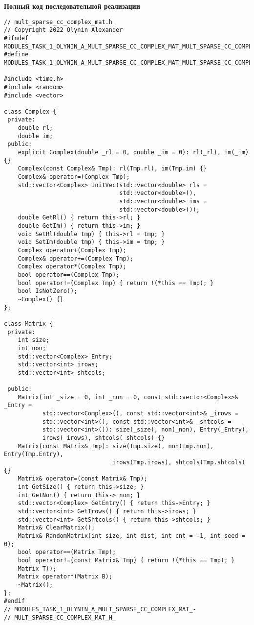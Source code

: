 \documentclass{report}
\begin{document}
\textbf{Полный код последовательной реализации}
\begin{lstlisting}
// mult_sparse_cc_complex_mat.h
// Copyright 2022 Olynin Alexander
#ifndef
MODULES_TASK_1_OLYNIN_A_MULT_SPARSE_CC_COMPLEX_MAT_MULT_SPARSE_CC_COMPLEX_MAT_H_
#define
MODULES_TASK_1_OLYNIN_A_MULT_SPARSE_CC_COMPLEX_MAT_MULT_SPARSE_CC_COMPLEX_MAT_H_

#include <time.h>
#include <random>
#include <vector>

class Complex {
 private:
    double rl;
    double im;
 public:
    explicit Complex(double _rl = 0, double _im = 0): rl(_rl), im(_im) {}
    Complex(const Complex& Tmp): rl(Tmp.rl), im(Tmp.im) {}
    Complex& operator=(Complex Tmp);
    std::vector<Complex> InitVec(std::vector<double> rls =
                                 std::vector<double>(),
                                 std::vector<double> ims =
                                 std::vector<double>());
    double GetRl() { return this->rl; }
    double GetIm() { return this->im; }
    void SetRl(double tmp) { this->rl = tmp; }
    void SetIm(double tmp) { this->im = tmp; }
    Complex operator+(Complex Tmp);
    Complex& operator+=(Complex Tmp);
    Complex operator*(Complex Tmp);
    bool operator==(Complex Tmp);
    bool operator!=(Complex Tmp) { return !(*this == Tmp); }
    bool IsNotZero();
    ~Complex() {}
};

class Matrix {
 private:
    int size;
    int non;
    std::vector<Complex> Entry;
    std::vector<int> irows;
    std::vector<int> shtcols;

 public:
    Matrix(int _size = 0, int _non = 0, const std::vector<Complex>& _Entry =
           std::vector<Complex>(), const std::vector<int>& _irows =
           std::vector<int>(), const std::vector<int>& _shtcols =
           std::vector<int>()): size(_size), non(_non), Entry(_Entry),
           irows(_irows), shtcols(_shtcols) {}
    Matrix(const Matrix& Tmp): size(Tmp.size), non(Tmp.non), Entry(Tmp.Entry),
                               irows(Tmp.irows), shtcols(Tmp.shtcols) {}
    Matrix& operator=(const Matrix& Tmp);
    int GetSize() { return this->size; }
    int GetNon() { return this-> non; }
    std::vector<Complex> GetEntry() { return this->Entry; }
    std::vector<int> GetIrows() { return this->irows; }
    std::vector<int> GetShtcols() { return this->shtcols; }
    Matrix& ClearMatrix();
    Matrix& RandomMatrix(int size, int dist, int cnt = -1, int seed = 0);
    bool operator==(Matrix Tmp);
    bool operator!=(const Matrix& Tmp) { return !(*this == Tmp); }
    Matrix T();
    Matrix operator*(Matrix B);
    ~Matrix();
};
#endif
// MODULES_TASK_1_OLYNIN_A_MULT_SPARSE_CC_COMPLEX_MAT_-
// MULT_SPARSE_CC_COMPLEX_MAT_H_
\end{lstlisting}
\end{document}

